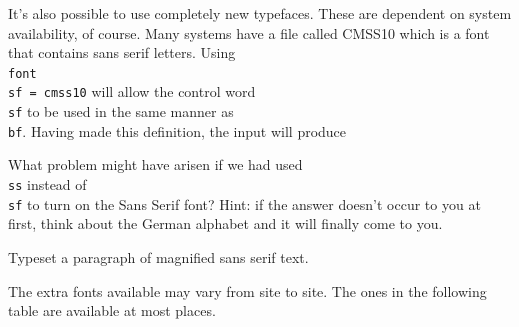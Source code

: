 \bigskip 

It's also possible to use completely new typefaces.  These 
are dependent on system availability, of course.  Many systems 
have a file called CMSS10 which is a font that contains sans 
serif letters.  Using {\tt \\font\\sf = cmss10} will allow the 
control word {\tt\\sf} to be used in the same manner as {\tt\\bf}. 
Having made this definition, the input 
will produce 

\exercise What problem might have arisen if we had used {\tt \\ss} 
instead of {\tt \\sf} to turn on the Sans Serif font? Hint: if 
the answer doesn't occur to you at first, think about the German 
alphabet and it will finally come to you. 

\exercise Typeset a paragraph of magnified sans serif text. 

The extra fonts available may vary from site to site.  The ones 
in the following table are available at most places. 

